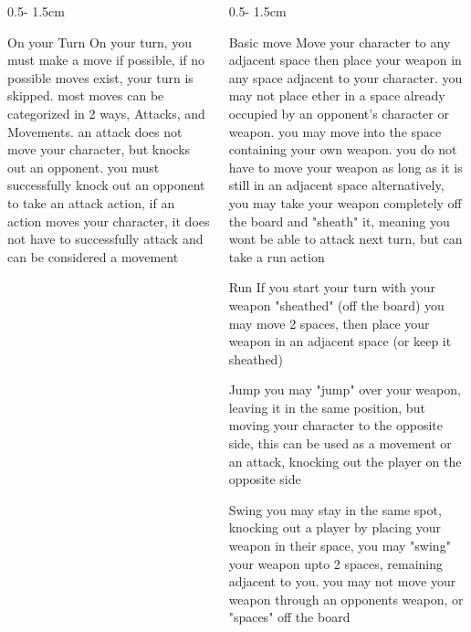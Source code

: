 \documentclass{uioposter}
\begin{document}
\begin{frame}
\begin{columns}[onlytextwidth]
\begin{column}{0.5\textwidth - 1.5cm}
    \begin{block}{On your Turn}
        On your turn, you must make a move if possible, if no possible moves exist, your turn is skipped. most moves can be categorized in 2 ways, Attacks, and Movements. an attack does not move your character, but knocks out an opponent. you must successfully knock out an opponent to take an attack action, if an action moves your character, it does not have to successfully attack and can be considered a movement
    \end{block}

\end{column}


\begin{column}{0.5\textwidth - 1.5cm}

    \begin{block}{Basic move}
        Move your character to any adjacent space
        then place your weapon in any space adjacent to your character.
        you may not place ether in a space already occupied by an opponent's character or weapon.
        you may move into the space containing your own weapon.
        you do not have to move your weapon as long as it is still in an adjacent space
        alternatively, you may take your weapon completely off the board and "sheath" it, meaning you wont be able to attack next turn, but can take a run action
    \end{block}

    \begin{block}{Run}
        If you start your turn with your weapon "sheathed" (off the board) you may move 2 spaces, then place your weapon in an adjacent space (or keep it sheathed)
    \end{block}

    \begin{block}{Jump}
        you may "jump" over your weapon, leaving it in the same position, but moving your character to the opposite side,
        this can be used as a movement or an attack, knocking out the player on the opposite side
    \end{block}

    \begin{block}{Swing}
        you may stay in the same spot, knocking out a player by placing your weapon in their space, you may "swing" your weapon upto 2 spaces, remaining adjacent to you. you may not move your weapon through an opponents weapon, or "spaces" off the board
    \end{block}


\end{column}
\end{columns}
\end{frame}
\end{document}
